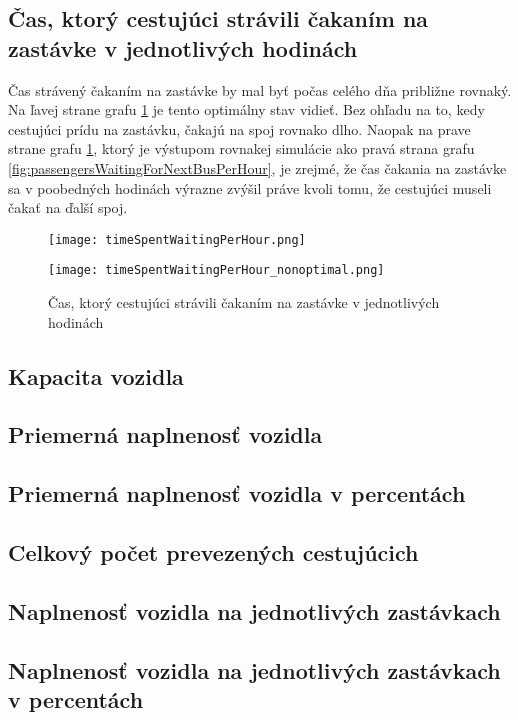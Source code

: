 \subsection*{Čas, ktorý cestujúci strávili čakaním na zastávke v jednotlivých hodinách}
Čas strávený čakaním na zastávke by mal byť počas celého dňa približne rovnaký.
Na ľavej strane grafu \ref{fig:timeSpentWaitingPerHour} je tento optimálny stav vidieť.
Bez ohľadu na to, kedy cestujúci prídu na zastávku, čakajú na spoj rovnako dlho.
Naopak na prave strane grafu \ref{fig:timeSpentWaitingPerHour}, ktorý je výstupom rovnakej simulácie ako pravá strana grafu \ref{fig:passengersWaitingForNextBusPerHour}, je zrejmé, že čas čakania na zastávke sa v poobedných hodinách výrazne zvýšil práve kvoli tomu, že cestujúci museli čakať na ďalší spoj.
\begin{figure}[h]
  \label{fig:timeSpentWaitingPerHour}
  \centering
  \begin{minipage}{0.49\textwidth}
    \texttt{[image: timeSpentWaitingPerHour.png]}
  \end{minipage}
  \begin{minipage}{0.49\textwidth}
    \texttt{[image: timeSpentWaitingPerHour\_nonoptimal.png]}
  \end{minipage}
  \caption{Čas, ktorý cestujúci strávili čakaním na zastávke v jednotlivých hodinách}
\end{figure}

\subsection*{Kapacita vozidla}
\subsection*{Priemerná naplnenosť vozidla}
\subsection*{Priemerná naplnenosť vozidla v percentách}
\subsection*{Celkový počet prevezených cestujúcich}
\subsection*{Naplnenosť vozidla na jednotlivých zastávkach}
\subsection*{Naplnenosť vozidla na jednotlivých zastávkach v percentách}

